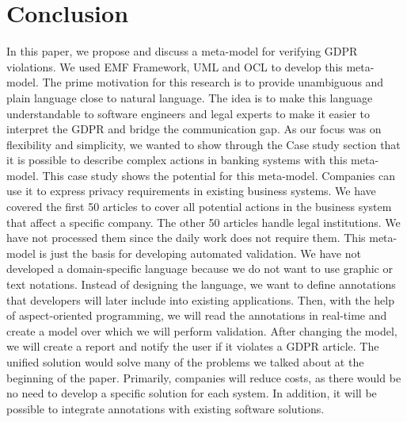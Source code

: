 \documentclass[11pt,english]{article}
\begin{document}
\section{Conclusion}
In this paper, we propose and discuss a meta-model for verifying GDPR violations. We used EMF Framework, UML and OCL to develop this meta-model. The prime motivation for this research is to provide unambiguous and plain language close to natural language. The idea is to make this language understandable to software engineers and legal experts to make it easier to interpret the GDPR and bridge the communication gap. \newline As our focus was on flexibility and simplicity, we wanted to show through the Case study section that it is possible to describe complex actions in banking systems with this meta-model. This case study shows the potential for this meta-model. Companies can use it to express privacy requirements in existing business systems. We have covered the first 50 articles to cover all potential actions in the business system that affect a specific company. The other 50 articles handle legal institutions. We have not processed them since the daily work does not require them. \newline This meta-model is just the basis for developing automated validation. We have not developed a domain-specific language because we do not want to use graphic or text notations. Instead of designing the language, we want to define annotations that developers will later include into existing applications. Then, with the help of aspect-oriented programming, we will read the annotations in real-time and create a model over which we will perform validation. After changing the model, we will create a report and notify the user if it violates a GDPR article. The unified solution would solve many of the problems we talked about at the beginning of the paper. Primarily, companies will reduce costs, as there would be no need to develop a specific solution for each system. In addition, it will be possible to integrate annotations with existing software solutions.
\printbibliography
\end{document}
